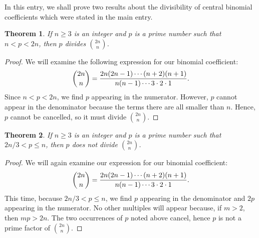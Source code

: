 \documentclass[12pt]{article}
\newtheorem{thm}{Theorem}
\begin{document}
In this entry, we shall prove two results about the
divisibility of central binomial coefficients
which were stated in the main entry.

\begin{thm}
If $n \ge 3$ is an integer and $p$ is a prime number such that $n < p < 2n$, then
$p$ divides ${2n \choose n}$.
\end{thm}

\begin{proof}
We will examine the following expression for our binomial coefficient:
\[
{2n \choose n} =
{2n (2n-1) \cdots (n+2) (n+1) \over
n (n-1) \cdots 3 \cdot 2 \cdot 1}.
\]
Since $n < p < 2n$, we find $p$ appearing in the numerator.  However,
$p$ cannot appear in the denominator because the terms there are all
smaller than $n$.  Hence, $p$ cannot be cancelled, so it must divide
${2n \choose n}$.
\end{proof}

\begin{thm}
If $n \ge 3$ is an integer and $p$ is a prime number such that $2n/3 < p \le n$, then
$p$ does not divide ${2n \choose n}$.
\end{thm}

\begin{proof}
We will again examine our expression for our binomial coefficient:
\[
{2n \choose n} =
{2n (2n-1) \cdots (n+2) (n+1) \over
n (n-1) \cdots 3 \cdot 2 \cdot 1}.
\]
This time, because $2n/3 < p \le n$, we find $p$ appearing in the denominator
and $2p$ appearing in the numerator.  No other multiples will appear because,
if $m > 2$, then $mp > 2n$.  The two occurrences of $p$ noted above cancel, hence
$p$ is not a prime factor of ${2n \choose n}$.
\end{proof}
\end{document}
